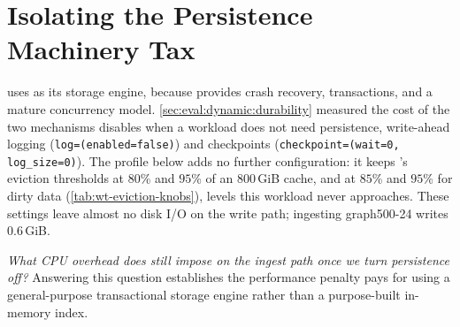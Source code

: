 
\section{Isolating the Persistence Machinery Tax}
\label{sec:wt-ingest-overhead}

\project{} uses \wt{} as its storage engine, because \wt{} provides crash recovery, transactions, and a mature concurrency model.
\autoref{sec:eval:dynamic:durability} measured the cost of the two mechanisms \project{} disables when a workload does not need persistence, write-ahead logging (\texttt{log=(enabled=false)}) and checkpoints (\texttt{checkpoint=(wait=0, log\_size=0)}).
The profile below adds no further configuration: it keeps \project{}'s eviction thresholds at $80$\% and $95$\% of an $800$\,GiB cache, and at $85$\% and $95$\% for dirty data (\autoref{tab:wt-eviction-knobs}), levels this workload never approaches.
These settings leave almost no disk I/O on the write path; ingesting graph500-24 writes $0.6$\,GiB.

\emph{What CPU overhead does \wt{} still impose on the ingest path once we turn persistence off?}
Answering this question establishes the performance penalty \project{} pays for using a general-purpose transactional storage engine rather than a purpose-built in-memory index.

